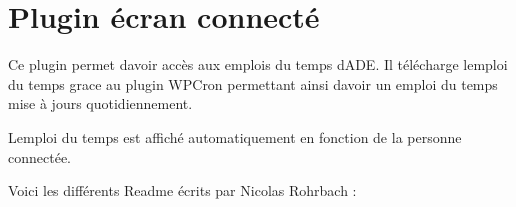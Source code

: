 \chapter{Plugin écran connecté}
\hypertarget{md__c_1_2_users_2gallo_2_one_drive_2_documents_2_s_a_x_c3_x_a9-casali_2www_2wp-content_2plugins_2plugin-ecran-connecte_2readme}{}\label{md__c_1_2_users_2gallo_2_one_drive_2_documents_2_s_a_x_c3_x_a9-casali_2www_2wp-content_2plugins_2plugin-ecran-connecte_2readme}
\label{md__c_1_2_users_2gallo_2_one_drive_2_documents_2_s_a_x_c3_x_a9-casali_2www_2wp-content_2plugins_2plugin-ecran-connecte_2readme_autotoc_md7}%
%


Ce plugin permet d\textquotesingle{}avoir accès aux emplois du temps d\textquotesingle{}ADE. Il télécharge l\textquotesingle{}emploi du temps grace au plugin WPCron permettant ainsi d\textquotesingle{}avoir un emploi du temps mise à jours quotidiennement.

L\textquotesingle{}emploi du temps est affiché automatiquement en fonction de la personne connectée.

Voici les différents Readme écrits par Nicolas Rohrbach \+:
\begin{DoxyItemize}
\item {}
\item {} ~\newline

\item {} ~\newline

\item {}
\end{DoxyItemize}

